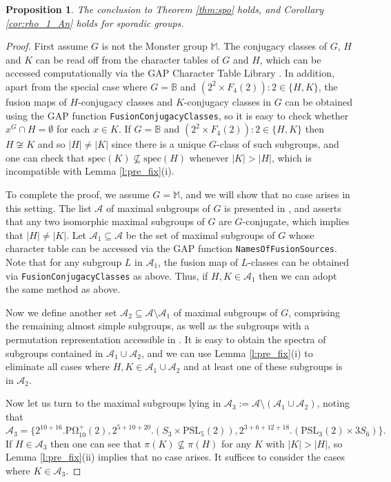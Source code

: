 \documentclass[twoside,a4paper,reqno,11pt]{amsart}
\newcommand{\<}{\langle}
\renewcommand{\>}{\rangle}
\newcommand{\PSL}{\mathrm{PSL}}
\newcommand{\POmega}{\mathrm{P\Omega}}
\newcommand{\Spec}{\mathrm{spec}}
\newtheorem{prop}[thm]{Proposition}
\theoremstyle{definition}
\begin{document}
	\begin{prop}
		\label{p:spo}
		The conclusion to Theorem \ref{thm:spo} holds, and Corollary \ref{cor:rho_1_An} holds for sporadic groups.
	\end{prop}
	
	\begin{proof}
		First assume $G$ is not the Monster group $\mathbb{M}$. The conjugacy classes of $G$, $H$ and $K$ can be read off from the character tables of $G$ and $H$, which can be accessed computationally via the \textsf{GAP} Character Table Library \cite{B_GAPCTL}. In addition, apart from the special case where $G = \mathbb{B}$ and $(2^2\times F_4(2)){:}2\in\{H,K\}$, the fusion maps of $H$-conjugacy classes and $K$-conjugacy classes in $G$ can be obtained using the \textsf{GAP} function \texttt{FusionConjugacyClasses}, so it is easy to check whether $x^G\cap H = \emptyset$ for each $x\in K$. If $G = \mathbb{B}$ and $(2^2\times F_4(2)){:}2\in\{H,K\}$ then $H\not\cong K$ and so $|H|\ne |K|$ since there is a unique $G$-class of such subgroups, and one can check that $\Spec(K)\not\subseteq\Spec(H)$ whenever $|K| > |H|$, which is incompatible with Lemma \ref{l:pre_fix}(i).
		
		To complete the proof, we assume $G = \mathbb{M}$, and we will show that no case arises in this setting. The list $\mathcal{A}$ of maximal subgroups of $G$ is presented in \cite[Table 1]{DLP_M}, and \cite[Theorem 1]{DLP_M} asserts that any two isomorphic maximal subgroups of $G$ are $G$-conjugate, which implies that $|H|\ne |K|$. Let $\mathcal{A}_1\subseteq \mathcal{A}$ be the set of maximal subgroups of $G$ whose character table can be accessed via the \textsf{GAP} function \texttt{NamesOfFusionSources}. Note that for any subgroup $L$ in $\mathcal{A}_1$, the fusion map of $L$-classes can be obtained via \texttt{FusionConjugacyClasses} as above. Thus, if $H,K\in\mathcal{A}_1$ then we can adopt the same method as above.
		
		Now we define another set $\mathcal{A}_2\subseteq\mathcal{A}\setminus\mathcal{A}_1$ of maximal subgroups of $G$, comprising the remaining almost simple subgroups, as well as the subgroups with a permutation representation accessible in \cite{W_WebAt}. It is easy to obtain the spectra of subgroups contained in $\mathcal{A}_1\cup \mathcal{A}_2$, and we can use Lemma \ref{l:pre_fix}(i) to eliminate all cases where $H,K\in\mathcal{A}_1\cup\mathcal{A}_2$ and at least one of these subgroups is in $\mathcal{A}_2$.
		
		Now let us turn to the maximal subgroups lying in $\mathcal{A}_3:=\mathcal{A}\setminus(\mathcal{A}_1\cup\mathcal{A}_2)$, noting that
		\begin{equation*}
		\mathcal{A}_3 = \{2^{10+16}.\POmega_{10}^+(2),2^{5+10+20}.(S_3\times \PSL_5(2)),2^{3+6+12+18}.(\PSL_3(2)\times 3S_6)\}.
		\end{equation*}
		If $H\in\mathcal{A}_3$ then one can see that $\pi(K)\not\subseteq\pi(H)$ for any $K$ with $|K| > |H|$, so Lemma \ref{l:pre_fix}(ii) implies that no case arises. It suffices to consider the cases where $K\in\mathcal{A}_3$.
		

\end{proof}
\end{document}
